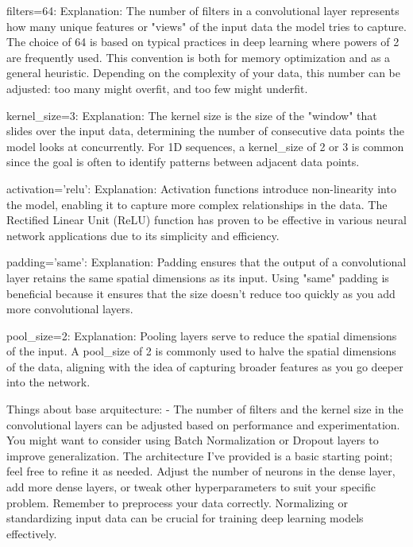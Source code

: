     filters=64:
        Explanation: The number of filters in a convolutional layer represents how many unique features or "views" of the input data the model tries to capture. The choice of 64 is based on typical practices in deep learning where powers of 2 are frequently used. This convention is both for memory optimization and as a general heuristic. Depending on the complexity of your data, this number can be adjusted: too many might overfit, and too few might underfit.

    kernel_size=3:
        Explanation: The kernel size is the size of the "window" that slides over the input data, determining the number of consecutive data points the model looks at concurrently. For 1D sequences, a kernel_size of 2 or 3 is common since the goal is often to identify patterns between adjacent data points.

    activation='relu':
        Explanation: Activation functions introduce non-linearity into the model, enabling it to capture more complex relationships in the data. The Rectified Linear Unit (ReLU) function has proven to be effective in various neural network applications due to its simplicity and efficiency.

    padding='same':
        Explanation: Padding ensures that the output of a convolutional layer retains the same spatial dimensions as its input. Using "same" padding is beneficial because it ensures that the size doesn’t reduce too quickly as you add more convolutional layers.

    pool_size=2:
        Explanation: Pooling layers serve to reduce the spatial dimensions of the input. A pool_size of 2 is commonly used to halve the spatial dimensions of the data, aligning with the idea of capturing broader features as you go deeper into the network.






Things about base arquitecture: 
    -   The number of filters and the kernel size in the convolutional layers can be adjusted based on performance and experimentation.
    You might want to consider using Batch Normalization or Dropout layers to improve generalization.
    The architecture I've provided is a basic starting point; feel free to refine it as needed. Adjust the number of neurons in the dense layer, add more dense layers, or tweak other hyperparameters to suit your specific problem.
    Remember to preprocess your data correctly. Normalizing or standardizing input data can be crucial for training deep learning models effectively.




